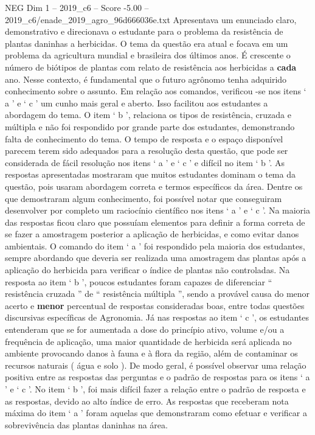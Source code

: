 \begin{textsample}{NEG Dim 1 – 2019\_c6 – Score -5.00 – 2019\_c6/enade\_2019\_agro\_96d666036e.txt}
Apresentava um enunciado claro, demonstrativo e direcionava o estudante para o problema da resistência de plantas daninhas a herbicidas.
O tema da questão era atual e focava em um problema da agricultura mundial e brasileira dos últimos anos.
É crescente o número de biótipos de plantas com relato de resistência aos herbicidas a \textbf{cada} ano.
Nesse contexto, é fundamental que o futuro agrônomo tenha adquirido conhecimento sobre o assunto.
Em relação aos comandos, verificou -se nos itens ‘ a ’ e ‘ c ’ um cunho mais geral e aberto.
Isso facilitou aos estudantes a abordagem do tema.
O item ‘ b ’, relaciona os tipos de resistência, cruzada e múltipla e não foi respondido por grande parte dos estudantes, demonstrando falta de conhecimento do tema.
O tempo de resposta e o espaço disponível parecem terem sido adequados para a resolução desta questão, que pode ser considerada de fácil resolução nos itens ‘ a ’ e ‘ c ’ e difícil no item ‘ b ’.
As respostas apresentadas mostraram que muitos estudantes dominam o tema da questão, pois usaram abordagem correta e termos específicos da área.
Dentre os que demostraram algum conhecimento, foi possível notar que conseguiram desenvolver por completo um raciocínio científico nos itens ‘ a ’ e ‘ c ’.
Na maioria das respostas ficou claro que possuíam elementos para definir a forma correta de se fazer a amostragem posterior a aplicação de herbicidas, e como evitar danos ambientais.
O comando do item ‘ a ’ foi respondido pela maioria dos estudantes, sempre abordando que deveria ser realizada uma amostragem das plantas após a aplicação do herbicida para verificar o índice de plantas não controladas.
Na resposta ao item ‘ b ’, poucos estudantes foram capazes de diferenciar “ resistência cruzada ” de “ resistência múltipla ”, sendo a provável causa do menor acerto e \textbf{menor} percentual de respostas consideradas boas, entre todas questões discursivas específicas de Agronomia.
Já nas respostas ao item ‘ c ’, os estudantes entenderam que se for aumentada a dose do princípio ativo, volume e/ou a frequência de aplicação, uma maior quantidade de herbicida será aplicada no ambiente provocando danos à fauna e à flora da região, além de contaminar os recursos naturais ( água e solo ).
De modo geral, é possível observar uma relação positiva entre as respostas das perguntas e o padrão de respostas para os itens ‘ a ’ e ‘ c ’.
No item ‘ b ’, foi mais difícil fazer a relação entre o padrão de resposta e as respostas, devido ao alto índice de erro.
As respostas que receberam nota máxima do item ‘ a ’ foram aquelas que demonstraram como efetuar e verificar a sobrevivência das plantas daninhas na área.

\end{textsample}
